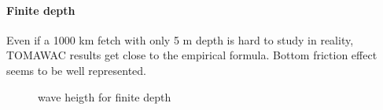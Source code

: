 \paragraph*{Finite depth}
Even if a 1000 km fetch with only 5 m depth is hard to study in reality, TOMAWAC results get close to the empirical formula. Bottom friction effect seems to be well represented.
\begin{figure}[h!]
\label{finite}
  \centering
      \caption{wave heigth for finite depth}
\end{figure}
